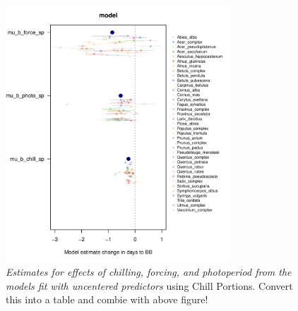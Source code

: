 \documentclass{article}
\begin{document}
\begin{figure}[h!]
\centering
\noindent \includegraphics[width=0.75\textwidth]{..//..//analyses/bb_analysis/figures/muplotmodelm2lni_spcompexprampfpcp_nonz.pdf}
\caption{\emph{Estimates for effects of chilling, forcing, and photoperiod from the models fit with uncentered predictors} using Chill Portions. Convert this into a table and combie with above figure!} 
\label{fig:mucpnonz}
\end{figure}
\end{document}
